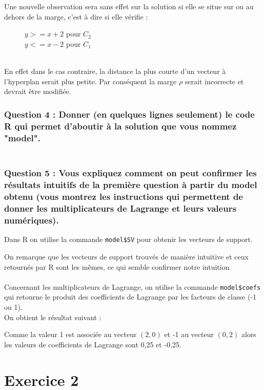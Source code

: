 \documentclass[a4paper, 10pt]{article}
\begin{document}
Une nouvelle observation sera sans effet sur la solution si elle se situe sur ou au dehors de la marge, c'est à dire si elle vérifie :
\begin{figure}[h!]
 \centering
$y >= x + 2$ pour $C_{2}$\\
$y <= x - 2$ pour $C_{1}$
\end{figure}\\
En effet dans le cas contraire, la distance la plus courte d'un vecteur à l'hyperplan serait plus petite.
Par conséquent la marge $\rho$ serait incorrecte et devrait être modifiée. 

\subsubsection*{Question 4 : Donner (en quelques lignes seulement) le code R qui permet d’aboutir à la solution que vous
nommez "model".}



\subsubsection*{\\Question 5 : Vous expliquez comment on peut confirmer les résultats intuitifs de la première question à
partir du model obtenu (vous montrez les instructions qui permettent de donner les multiplicateurs
de Lagrange et leurs valeurs numériques).}

Dans R on utilise la commande \texttt{model\$SV} pour obtenir les vecteurs de support.

On remarque que les vecteurs de support trouvés de manière intuitive et ceux retournés par R sont les mêmes, ce qui semble confirmer notre intuition.\\ \\
Concernant les multiplicateurs de Lagrange, on utilise la commande \texttt{model\$coefs} qui retourne le produit des coefficients de Lagrange par les facteurs de classe (-1 ou 1).\\
On obtient le résultat suivant :

Comme la valeur 1 est associée au vecteur $(2,0)$ et -1 au vecteur $(0,2)$ alors les valeurs de coefficients de Lagrange sont 0,25 et -0,25.

\newpage
\section*{Exercice 2}
\end{document}
